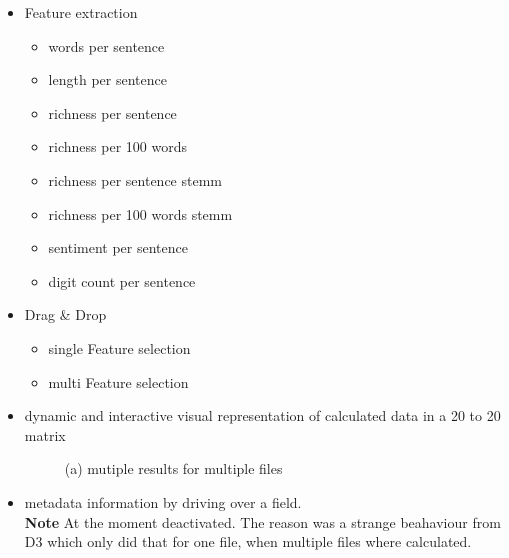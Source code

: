 \documentclass[runningheads]{llncs}
\begin{document}
\begin{itemize}
    \item Feature extraction
    \begin{itemize}
        \item words per sentence
        \item length per sentence
        \item richness per sentence
        \item richness per 100 words
        \item richness per sentence stemm
        \item richness per 100 words stemm
        \item sentiment per sentence
        \item digit count per sentence
    \end{itemize}
    \item Drag \& Drop
    \begin{itemize}
        \item single Feature selection
        \item multi Feature selection
    \end{itemize}
    \item dynamic and interactive visual representation of calculated data in a 20 to 20 matrix 
    \begin{figure}
        \centering
        \caption{(a) mutiple results for multiple files}
        \label{fig:heatmap}
    \end{figure}
    \item metadata information by driving over a field. \\
    \textbf{Note} At the moment deactivated. The reason was a strange beahaviour from D3 which only did that for one file, when multiple files where calculated.
    \begin{figure}
        \centering

\end{figure}
\end{itemize}
\end{document}

